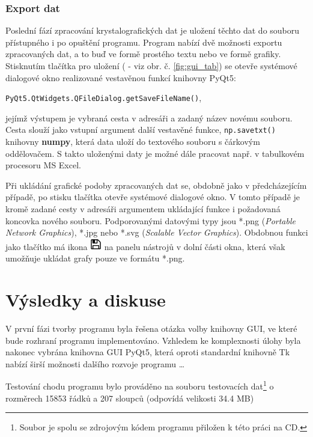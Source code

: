 \documentclass[a4paper, 12pt]{article}
\newcommand*{\Icon}{\includegraphics[width=0.5cm, height=0.5cm]{icon.PNG}}%
\begin{document}
\subsubsection{Export dat} \label{sec:export}
Poslední fází zpracování krystalografických dat je uložení těchto dat do souboru přístupného i po opuštění programu. Program nabízí dvě možnosti exportu zpracovaných dat, a to buď ve formě prostého textu nebo ve formě grafiky.
Stisknutím tlačítka pro uložení ( - viz obr. č. \ref{fig:gui_tab}) se otevře systémové dialogové okno realizované vestavěnou funkcí knihovny PyQt5:
\begin{center}
 \texttt{PyQt5.QtWidgets.QFileDialog.getSaveFileName()},   
\end{center}
jejímž výstupem je vybraná cesta v adresáři a zadaný název novému souboru. Cesta slouží jako vstupní argument další vestavěné funkce, \texttt{np.savetxt()} knihovny \textbf{numpy}, která data uloží do textového souboru s čárkovým oddělovačem. S takto uloženými daty je možné dále pracovat např. v tabulkovém procesoru MS Excel.

Při ukládání grafické podoby zpracovaných dat se, obdobně jako v předcházejícím případě, po stisku tlačítka  otevře systémové dialogové okno. V tomto případě je kromě zadané cesty v adresáři argumentem ukládající funkce i požadovaná koncovka nového souboru. Podporovanými datovými typy jsou *.png (\textit{Portable Network Graphics}), *.jpg nebo *.svg (\textit{Scalable Vector Graphics}). Obdobnou funkci jako tlačítko  má ikona \hspace{0.09cm}\Icon\hspace{0.09cm} na panelu nástrojů v dolní části okna, která však umožňuje ukládat grafy pouze ve formátu *.png.

\newpage

\section{Výsledky a diskuse} \label{sec:diskuze}
V první fázi tvorby programu byla řešena otázka volby knihovny GUI, ve které bude rozhraní programu implementováno. Vzhledem ke komplexnosti úlohy byla nakonec vybrána knihovna GUI PyQt5, která oproti standardní knihovně Tk nabízí širší možnosti dalšího rozvoje programu \ldots
\vskip 0.5in

Testování chodu programu bylo prováděno na souboru testovacích dat\footnote{Soubor  je spolu se zdrojovým kódem programu přiložen k této práci na CD.} o rozměrech 15853 řádků a 207 sloupců (odpovídá velikosti 34.4 MB)
\end{document}
